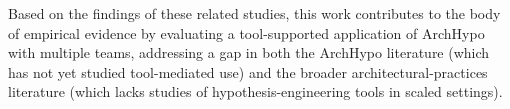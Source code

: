 Based on the findings of these related studies, this work contributes to the body of empirical evidence by evaluating a
tool-supported application of ArchHypo with multiple teams, addressing a gap in both the ArchHypo literature (which has not yet studied tool-mediated use) and the broader
architectural-practices literature (which lacks studies of hypothesis-engineering tools in scaled settings).
